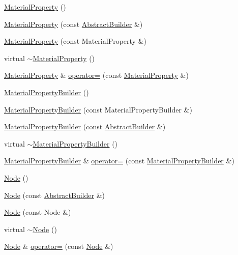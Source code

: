 \begin{DoxyCompactItemize}
\item 
\hyperlink{namespacejli_aac4773f4081fe5e6116c6e85803b59e0}{Material\+Property} ()
\item 
\hyperlink{namespacejli_acba837966af210890b7418fc4926d2eb}{Material\+Property} (const \hyperlink{classjli_1_1_abstract_builder}{Abstract\+Builder} \&)
\item 
\hyperlink{namespacejli_afb1bbc3b06ceaaf5d288bdf3c615d1d7}{Material\+Property} (const Material\+Property \&)
\item 
virtual \hyperlink{namespacejli_a79beb0a52804d6f437114e88a6a133f3}{$\sim$\+Material\+Property} ()
\item 
\hyperlink{namespacejli_aac4773f4081fe5e6116c6e85803b59e0}{Material\+Property} \& \hyperlink{namespacejli_aeefe2ec73e0e0a8ec963ff328b8b7008}{operator=} (const \hyperlink{namespacejli_aac4773f4081fe5e6116c6e85803b59e0}{Material\+Property} \&)
\item 
\hyperlink{namespacejli_a96c22be2baa4ce5a1d9759cb6165b155}{Material\+Property\+Builder} ()
\item 
\hyperlink{namespacejli_aac6faf9ab92632aac5d6e880e2b00c6f}{Material\+Property\+Builder} (const Material\+Property\+Builder \&)
\item 
\hyperlink{namespacejli_a3e8b5f64fd8e55aabc11e1bd4d65035d}{Material\+Property\+Builder} (const \hyperlink{classjli_1_1_abstract_builder}{Abstract\+Builder} \&)
\item 
virtual \hyperlink{namespacejli_a7bde168b5814dd6f64f8b5259e0b0ff6}{$\sim$\+Material\+Property\+Builder} ()
\item 
\hyperlink{namespacejli_a96c22be2baa4ce5a1d9759cb6165b155}{Material\+Property\+Builder} \& \hyperlink{namespacejli_aa54ffee03b6511da6a96faa055b0275f}{operator=} (const \hyperlink{namespacejli_a96c22be2baa4ce5a1d9759cb6165b155}{Material\+Property\+Builder} \&)
\item 
\hyperlink{namespacejli_ad3ae8427886d6e7375c62a7fb2100c4c}{Node} ()
\item 
\hyperlink{namespacejli_ac427b39c9353f0301e191f76d360d4f1}{Node} (const \hyperlink{classjli_1_1_abstract_builder}{Abstract\+Builder} \&)
\item 
\hyperlink{namespacejli_ad63185457aa77be28b780050799426f3}{Node} (const Node \&)
\item 
virtual \hyperlink{namespacejli_ac46db977b2fba42d8384ccab749c9cd4}{$\sim$\+Node} ()
\item 
\hyperlink{namespacejli_ad3ae8427886d6e7375c62a7fb2100c4c}{Node} \& \hyperlink{namespacejli_a89c4ecf3f3675ba37131cae61a631143}{operator=} (const \hyperlink{namespacejli_ad3ae8427886d6e7375c62a7fb2100c4c}{Node} \&)

\end{DoxyCompactItemize}

